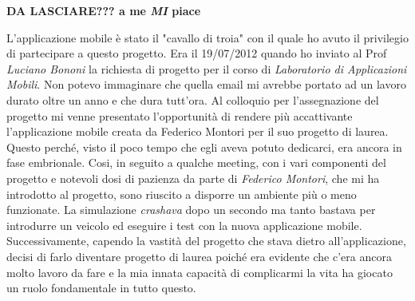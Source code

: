 \textbf{DA LASCIARE??? a me \emph{MI} piace}

L'applicazione mobile è stato il "cavallo di troia" con il quale ho avuto il privilegio di partecipare a questo progetto. Era il 19/07/2012 quando ho inviato al Prof \emph{Luciano Bononi} la richiesta di progetto per il corso di \emph{Laboratorio di Applicazioni Mobili}. Non potevo immaginare che quella email mi avrebbe portato ad un lavoro durato oltre un anno e che dura tutt'ora.
Al colloquio per l'assegnazione del progetto mi venne presentato l'opportunità di rendere più accattivante l'applicazione mobile creata da Federico Montori per il suo progetto di laurea. Questo perché, visto il poco tempo che egli aveva potuto dedicarci, era ancora in fase embrionale.
Cosi, in seguito a qualche meeting, con i vari componenti del progetto e notevoli dosi di pazienza da parte di \emph{Federico Montori}, che mi ha introdotto al progetto, sono riuscito a disporre un ambiente più o meno funzionate. La simulazione \emph{crashava} dopo un secondo ma tanto bastava per introdurre un veicolo ed eseguire i test con la nuova applicazione mobile.
Successivamente, capendo la vastità del progetto che stava dietro all'applicazione, decisi di farlo diventare progetto di laurea poiché era evidente che c'era ancora molto lavoro da fare e la mia innata capacità di complicarmi la vita ha giocato un ruolo fondamentale in tutto questo.

